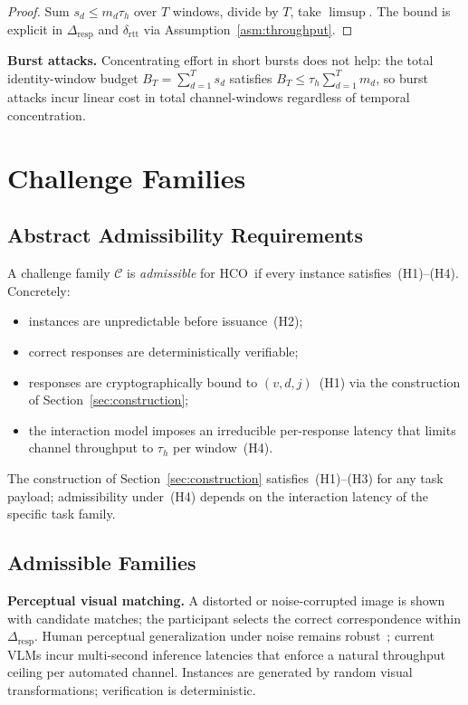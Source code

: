 \documentclass[11pt]{article}
\newcommand{\HCO}{HCO\xspace}
\theoremstyle{remark}
\theoremstyle{plain}
\begin{document}
	\begin{proof}
		Sum $s_d \le m_d\tau_h$ over $T$ windows, divide by $T$, take
		$\limsup$. The bound is explicit in $\Delta_{\mathrm{resp}}$ and
		$\delta_{\mathrm{rtt}}$ via Assumption~\ref{asm:throughput}.
	\end{proof}
	
	\noindent\textbf{Burst attacks.}
	Concentrating effort in short bursts does not help: the total
	identity-window budget $B_T = \sum_{d=1}^T s_d$ satisfies
	$B_T \le \tau_h\sum_{d=1}^T m_d$, so burst attacks incur linear
	cost in total channel-windows regardless of temporal concentration.
	
	
	\section{Challenge Families}
	\label{sec:challenges}
	
	\subsection{Abstract Admissibility Requirements}
	
	A challenge family $\mathcal{C}$ is \emph{admissible} for \HCO\ if
	every instance satisfies~(H1)--(H4). Concretely:
	\begin{itemize}
		\item instances are unpredictable before issuance~(H2);
		\item correct responses are deterministically verifiable;
		\item responses are cryptographically bound to $(v,d,j)$~(H1)
		via the construction of Section~\ref{sec:construction};
		\item the interaction model imposes an irreducible per-response
		latency that limits channel throughput to $\tau_h$ per window~(H4).
	\end{itemize}
	The construction of Section~\ref{sec:construction} satisfies~(H1)--(H3)
	for any task payload; admissibility under~(H4) depends on the interaction
	latency of the specific task family.
	
	\subsection{Admissible Families}
	
	\noindent\textbf{Perceptual visual matching.}
	A distorted or noise-corrupted image is shown with candidate matches;
	the participant selects the correct correspondence within
	$\Delta_{\mathrm{resp}}$. Human perceptual generalization under noise
	remains robust~\cite{geirhos2018generalisation}; current VLMs incur
	multi-second inference latencies that enforce a natural throughput ceiling
	per automated channel. Instances are generated by random visual
	transformations; verification is deterministic.
	
\end{document}
